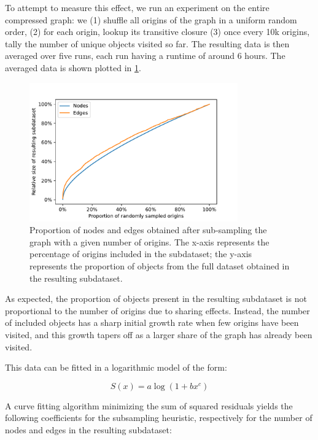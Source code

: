 To attempt to measure this effect, we run an experiment on the entire
compressed graph: we (1) shuffle all origins of the graph in a uniform
random order, (2) for each origin, lookup its transitive closure (3) once every
10k origins, tally the number of unique objects visited so far. The resulting
data is then averaged over five runs, each run having a runtime of around 6
hours.  The averaged data is shown plotted in
\cref{fig:subdataset-size-function}.

\begin{figure}
    \centering
    \includegraphics[width=0.8\textwidth]{img/graph-exploitation/subdataset_size_function}
    \caption{Proportion of nodes and edges obtained after sub-sampling the
        graph with a given number of origins. The x-axis represents the
        percentage of origins included in the subdataset; the y-axis represents
        the proportion of objects from the full dataset obtained in the
    resulting subdataset.}%
    \label{fig:subdataset-size-function}
\end{figure}

As expected, the proportion of objects present in the resulting subdataset is
not proportional to the number of origins due to sharing effects. Instead,
the number of included objects has a sharp initial growth rate when few origins
have been visited, and this growth tapers off as a larger share of the graph
has already been visited.

This data can be fitted in a logarithmic model of the form:

\[S(x) = a \log(1+bx^c)\]

A curve fitting algorithm minimizing the sum of squared residuals yields the
following coefficients for the subsampling heuristic, respectively for the
number of nodes and edges in the resulting subdataset:

